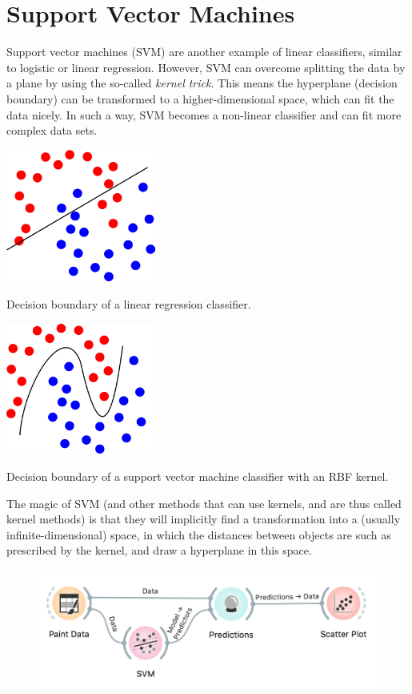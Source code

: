 \chapter{Support Vector Machines}
\label{ch:svm}

Support vector machines (SVM) are another example of linear classifiers, similar to logistic or linear regression. However, SVM can overcome splitting the data by a plane by using the so-called \textit{kernel trick}. This means the hyperplane (decision boundary) can be transformed to a higher-dimensional space, which can fit the data nicely. In such a way, SVM becomes a non-linear classifier and can fit more complex data sets.

\begin{marginfigure}
    \includegraphics[width=50mm]{linear-regression.png}%
    \caption{Decision boundary of a linear regression classifier.}
  \end{marginfigure}

\begin{marginfigure}
    \includegraphics[width=50mm]{svm.png}%
    \caption{Decision boundary of a support vector machine classifier with an RBF kernel.}
\end{marginfigure}

The magic of SVM (and other methods that can use kernels, and are thus called kernel methods) is that they will implicitly find a transformation into a (usually infinite-dimensional) space, in which the distances between objects are such as prescribed by the kernel, and draw a hyperplane in this space.

\begin{figure}[h]
    \centering
    \vspace{-0.2cm}
    \includegraphics[scale=0.5]{workflow.png}
\end{figure}

